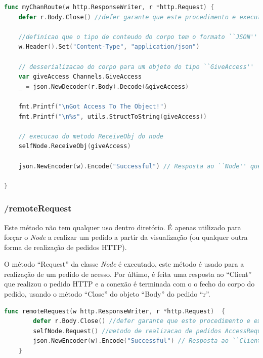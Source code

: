 \begin{lstlisting}[caption={\emph{Handler} ``myChanRoute'' do método ``/myChan''},language=Go]
func myChanRoute(w http.ResponseWriter, r *http.Request) {
	defer r.Body.Close() //defer garante que este procedimento e executado quando a execucao deste ``Handler'' termina

	//definicao que o tipo de conteudo do corpo tem o formato ``JSON''
	w.Header().Set("Content-Type", "application/json")

	// desserializacao do corpo para um objeto do tipo ``GiveAccess''
	var giveAccess Channels.GiveAccess
	_ = json.NewDecoder(r.Body).Decode(&giveAccess)

	fmt.Printf("\nGot Access To The Object!")
	fmt.Printf("\n%s", utils.StructToString(giveAccess))

	// execucao do metodo ReceiveObj do node
	selfNode.ReceiveObj(giveAccess)

	json.NewEncoder(w).Encode("Successful") // Resposta ao ``Node'' que realizou o pedido \acs{HTTP}

}

\end{lstlisting}

\subsubsection*{/remoteRequest}

Este método não tem qualquer uso dentro diretório.
É apenas utilizado para forçar o \emph{Node} a realizar um pedido a partir da visualização (ou qualquer outra forma de realização de pedidos \acs{HTTP}).

O método ``Request'' da classe \emph{Node} é executado, este método é usado para a realização de um pedido de acesso.
Por último, é feita uma resposta ao ``Client'' que realizou o pedido \acs{HTTP} e a conexão é terminada com 
o o fecho do corpo do pedido, usando o método ``Close'' do objeto ``Body'' do pedido ``r''.

\begin{lstlisting}[caption={\emph{Handler} ``myChanRoute'' do método ``/myChan''},language=Go]
	func remoteRequest(w http.ResponseWriter, r *http.Request)  {
		defer r.Body.Close() //defer garante que este procedimento e executado quando a execucao deste ``Handler'' termina
		selfNode.Request() //metodo de realizacao de pedidos AccessRequest
		json.NewEncoder(w).Encode("Successful") // Resposta ao ``Client'' que realizou o pedido
	}
	

\end{lstlisting}

